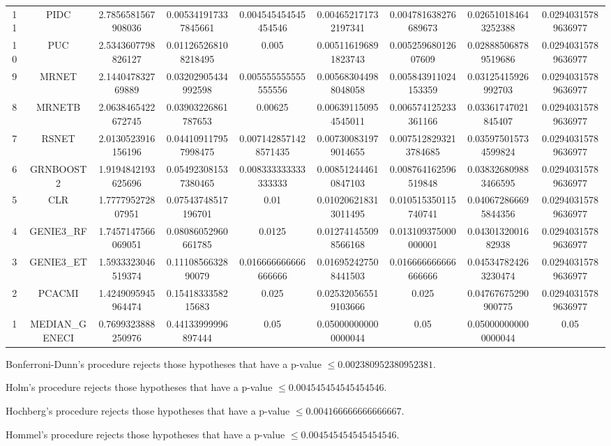 \documentclass[a4paper,10pt]{article}
\begin{document}
\begin{landscape}
\begin{table}[!htp]
\begin{tabular}{ccccccccc}
11&PIDC&2.7856581567908036&0.005341917337845661&0.004545454545454546&0.004652171732197341&0.004781638276689673&0.026510184643252388&0.02940315789636977\\
10&PUC&2.5343607798826127&0.011265268108218495&0.005&0.005116196891823743&0.00525968012607609&0.028885068789519686&0.02940315789636977\\
9&MRNET&2.144047832769889&0.03202905434992598&0.005555555555555556&0.005683044988048058&0.005843911024153359&0.03125415926992703&0.02940315789636977\\
8&MRNETB&2.0638465422672745&0.03903226861787653&0.00625&0.006391150954545011&0.006574125233361166&0.03361747021845407&0.02940315789636977\\
7&RSNET&2.0130523916156196&0.044109117957998475&0.0071428571428571435&0.007300831979014655&0.0075128293213784685&0.035975015734599824&0.02940315789636977\\
6&GRNBOOST2&1.9194842193625696&0.054923081537380465&0.008333333333333333&0.008512444610847103&0.008764162596519848&0.038326809883466595&0.02940315789636977\\
5&CLR&1.777795272807951&0.07543748517196701&0.01&0.010206218313011495&0.010515350115740741&0.040672866695844356&0.02940315789636977\\
4&GENIE3_RF&1.7457147566069051&0.08086052960661785&0.0125&0.012741455098566168&0.013109375000000001&0.0430132001682938&0.02940315789636977\\
3&GENIE3_ET&1.5933323046519374&0.1110856632890079&0.016666666666666666&0.016952427508441503&0.016666666666666666&0.045347824263230474&0.02940315789636977\\
2&PCACMI&1.4249095945964474&0.1541833358215683&0.025&0.025320565519103666&0.025&0.04767675290900775&0.02940315789636977\\
1&MEDIAN_GENECI&0.7699323888250976&0.44133999996897444&0.05&0.050000000000000044&0.05&0.050000000000000044&0.05\\
\hline
\end{tabular}
\end{table}
Bonferroni-Dunn's procedure rejects those hypotheses that have a p-value $\le0.002380952380952381$.


Holm's procedure rejects those hypotheses that have a p-value $\le0.004545454545454546$.


Hochberg's procedure rejects those hypotheses that have a p-value $\le0.004166666666666667$.


Hommel's procedure rejects those hypotheses that have a p-value $\le0.004545454545454546$.



\end{landscape}
\end{document}
